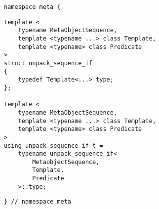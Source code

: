 \begin{verbatim}
namespace meta {
\end{verbatim}
\begin{verbatim}
template <
	typename MetaObjectSequence,
	template <typename ...> class Template,
	template <typename> class Predicate
>
struct unpack_sequence_if
{
	typedef Template<...> type;
};

template <
	typename MetaObjectSequence,
	template <typename ...> class Template,
	template <typename> class Predicate
>
using unpack_sequence_if_t =
	typename unpack_sequence_if<
		MetaobjectSequence,
		Template,
		Predicate
	>::type;
\end{verbatim}
\begin{verbatim}
} // namespace meta
\end{verbatim}

